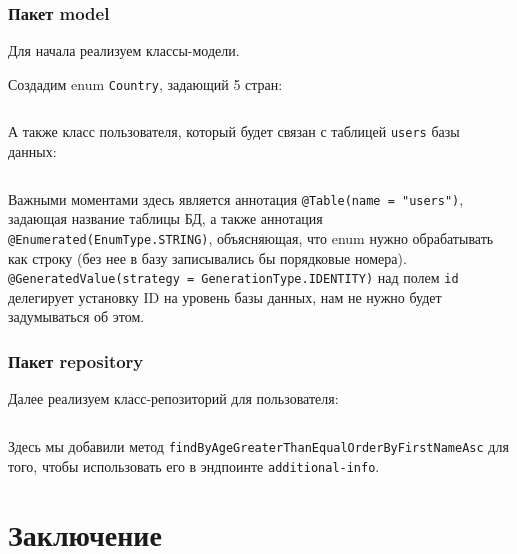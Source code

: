 \documentclass[a4paper, 14pt]{article}
\begin{document}
\subsubsection{Пакет model}

Для начала реализуем классы-модели.

Создадим enum \texttt{Country}, задающий 5 стран:

\normalsize
\inputminted[frame=single]{Java}{../src/main/java/ru/vspochernin/exam/model/Country.java}
\large

А также класс пользователя, который будет связан с таблицей \texttt{users} базы данных:

\normalsize
\inputminted[frame=single]{Java}{../src/main/java/ru/vspochernin/exam/model/User.java}
\large

Важными моментами здесь является аннотация \texttt{@Table(name = "users")}, задающая название таблицы БД, а также аннотация \texttt{@Enumerated(EnumType.STRING)}, объясняющая, что enum нужно обрабатывать как строку (без нее в базу записывались бы порядковые номера). \texttt{@GeneratedValue(strategy = GenerationType.IDENTITY)} над полем \texttt{id} делегирует установку ID на уровень базы данных, нам не нужно будет задумываться об этом.

\subsubsection{Пакет repository}

Далее реализуем класс-репозиторий для пользователя:

\normalsize
\inputminted[frame=single]{Java}{../src/main/java/ru/vspochernin/exam/repository/UserRepository.java}
\large

Здесь мы добавили метод \texttt{findByAgeGreaterThanEqualOrderByFirstNameAsc} для того, чтобы использовать его в эндпоинте \texttt{additional-info}.


\newpage
\section{Заключение}

\end{document}
